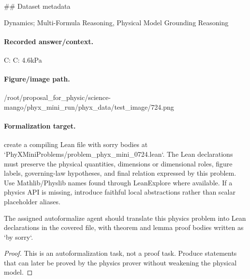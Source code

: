 \#\# Dataset metadata

Dynamics; Multi-Formula Reasoning, Physical Model Grounding Reasoning

\paragraph{Recorded answer/context.}
C: C: 4.6kPa

\paragraph{Figure/image path.}
/root/proposal\_for\_physic/science-mango/phyx\_mini\_run/phyx\_data/test\_image/724.png

\paragraph{Formalization target.}
create a compiling Lean file with sorry bodies at `PhyXMiniProblems/problem\_phyx\_mini\_0724.lean`. The Lean declarations must preserve the physical quantities, dimensions or dimensional roles, figure labels, governing-law hypotheses, and final relation expressed by this problem.
Use Mathlib/Physlib names found through LeanExplore where available. If a physics API is missing, introduce faithful local abstractions rather than scalar placeholder aliases.

\begin{theorem}
\label{thm:physics:phyx_mini_0724:target}
The assigned autoformalize agent should translate this physics problem into Lean declarations in the covered file, with theorem and lemma proof bodies written as `by sorry`.
\end{theorem}
\begin{proof}
This is an autoformalization task, not a proof task. Produce statements that can later be proved by the physics prover without weakening the physical model.
\end{proof}

